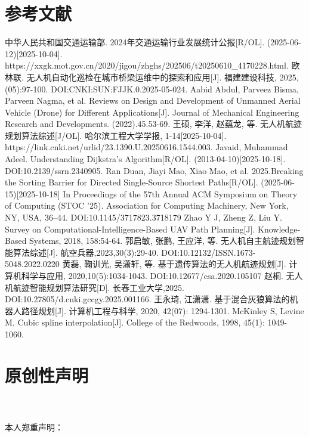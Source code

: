 \documentclass[12pt,a4paper,oneside,UTF8]{ctexart}
\begin{document}
\newpage\section{参考文献}\begin{thebibliography}{20}
中华人民共和国交通运输部. 2024年交通运输行业发展统计公报[R/OL]. (2025-06-12)[2025-10-04]. https://xxgk.mot.gov.cn/2020/jigou/zhghs/202506/t20250610\_4170228.html.
欧林联. 无人机自动化巡检在城市桥梁运维中的探索和应用[J]. 福建建设科技, 2025,(05):97-100. DOI:CNKI:SUN:FJJK.0.2025-05-024.
Aabid Abdul, Parveez Bisma, Parveen Nagma, et al. Reviews on Design and Development of Unmanned Aerial Vehicle (Drone) for Different Applications[J]. Journal of Mechanical Engineering Research and Developments. (2022).45.53-69.
王硕, 李洋, 赵蕴龙, 等. 无人机航迹规划算法综述[J/OL]. 哈尔滨工程大学学报, 1-14[2025-10-04]. https://link.cnki.net/urlid/23.1390.U.20250616.1544.003.
Javaid, Muhammad Adeel. Understanding Dijkstra's Algorithm[R/OL]. (2013-04-10)[2025-10-18]. DOI:10.2139/ssrn.2340905.
Ran Duan, Jiayi Mao, Xiao Mao, et al. 2025.Breaking the Sorting Barrier for Directed Single-Source Shortest Paths[R/OL]. (2025-06-15)[2025-10-18] In Proceedings of the 57th Annual ACM Symposium on Theory of Computing (STOC '25). Association for Computing Machinery, New York, NY, USA, 36–44. DOI:10.1145/3717823.3718179
Zhao Y J, Zheng Z, Liu Y. Survey on Computational-Intelligence-Based UAV Path Planning[J]. Knowledge-Based Systems, 2018, 158:54-64.
郭启敏, 张鹏, 王应洋, 等. 无人机自主航迹规划智能算法综述[J]. 航空兵器,2023,30(3):29-40. DOI:10.12132/ISSN.1673-5048.2022.0220 
黄磊, 鞠训光, 吴潇轩, 等. 基于遗传算法的无人机航迹规划[J]. 计算机科学与应用, 2020,10(5):1034-1043. DOI:10.12677/csa.2020.105107
赵桐. 无人机航迹智能规划算法研究[D]. 长春工业大学,2025. DOI:10.27805/d.cnki.gccgy.2025.001166.
王永琦, 江潇潇. 基于混合灰狼算法的机器人路径规划[J]. 计算机工程与科学, 2020, 42(07): 1294-1301.
McKinley S, Levine M. Cubic spline interpolation[J]. College of the Redwoods, 1998, 45(1): 1049-1060.
\end{thebibliography}
\newpage\section{原创性声明}
~\\
~\\
本人郑重声明：
\end{document}
